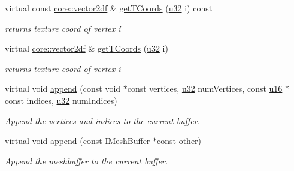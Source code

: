 \begin{DoxyCompactItemize}
\mbox{\label{classirr_1_1scene_1_1CMeshBuffer_a2823a97a353b6909e66a18dca46a8f30}} 
virtual const \hyperlink{namespaceirr_1_1core_a116f90bd31515724b6235014ee2b74d5}{core\+::vector2df} \& \hyperlink{classirr_1_1scene_1_1CMeshBuffer_a2823a97a353b6909e66a18dca46a8f30}{get\+T\+Coords} (\hyperlink{namespaceirr_a0416a53257075833e7002efd0a18e804}{u32} i) const
\begin{DoxyCompactList}\small\item\em returns texture coord of vertex i \end{DoxyCompactList}\item 
\mbox{\label{classirr_1_1scene_1_1CMeshBuffer_a50e1a283111e3aa8325a7e774f08fb27}} 
virtual \hyperlink{namespaceirr_1_1core_a116f90bd31515724b6235014ee2b74d5}{core\+::vector2df} \& \hyperlink{classirr_1_1scene_1_1CMeshBuffer_a50e1a283111e3aa8325a7e774f08fb27}{get\+T\+Coords} (\hyperlink{namespaceirr_a0416a53257075833e7002efd0a18e804}{u32} i)
\begin{DoxyCompactList}\small\item\em returns texture coord of vertex i \end{DoxyCompactList}\item 
virtual void \hyperlink{classirr_1_1scene_1_1CMeshBuffer_a7efd85cba5d5d86bee8c2ea2fe0524d9}{append} (const void $\ast$const vertices, \hyperlink{namespaceirr_a0416a53257075833e7002efd0a18e804}{u32} num\+Vertices, const \hyperlink{namespaceirr_ae9f8ec82692ad3b83c21f555bfa70bcc}{u16} $\ast$const indices, \hyperlink{namespaceirr_a0416a53257075833e7002efd0a18e804}{u32} num\+Indices)
\begin{DoxyCompactList}\small\item\em Append the vertices and indices to the current buffer. \end{DoxyCompactList}\item 
virtual void \hyperlink{classirr_1_1scene_1_1CMeshBuffer_af48b88e6c1bd79e6abd6a6803aa106c0}{append} (const \hyperlink{classirr_1_1scene_1_1IMeshBuffer}{I\+Mesh\+Buffer} $\ast$const other)
\begin{DoxyCompactList}\small\item\em Append the meshbuffer to the current buffer. \end{DoxyCompactList}\item 
\mbox{\label{classirr_1_1scene_1_1CMeshBuffer_adae334e8431e647d837acda0fada8bd5}} 

\end{DoxyCompactItemize}
